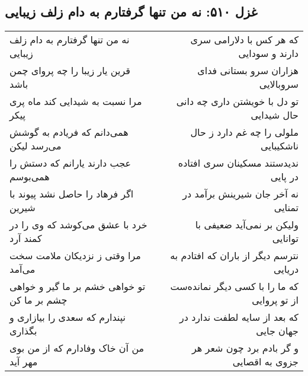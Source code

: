 \begin{center}
\section*{غزل ۵۱۰: نه من تنها گرفتارم به دام زلف زیبایی}
\label{sec:510}
\begin{longtable}{l p{0.5cm} r}
نه من تنها گرفتارم به دام زلف زیبایی
&&
که هر کس با دلارامی سری دارند و سودایی
\\
قرین یار زیبا را چه پروای چمن باشد
&&
هزاران سرو بستانی فدای سروبالایی
\\
مرا نسبت به شیدایی کند ماه پری پیکر
&&
تو دل با خویشتن داری چه دانی حال شیدایی
\\
همی‌دانم که فریادم به گوشش می‌رسد لیکن
&&
ملولی را چه غم دارد ز حال ناشکیبایی
\\
عجب دارند یارانم که دستش را همی‌بوسم
&&
ندیدستند مسکینان سری افتاده در پایی
\\
اگر فرهاد را حاصل نشد پیوند با شیرین
&&
نه آخر جان شیرینش برآمد در تمنایی
\\
خرد با عشق می‌کوشد که وی را در کمند آرد
&&
ولیکن بر نمی‌آید ضعیفی با توانایی
\\
مرا وقتی ز نزدیکان ملامت سخت می‌آمد
&&
نترسم دیگر از باران که افتادم به دریایی
\\
تو خواهی خشم بر ما گیر و خواهی چشم بر ما کن
&&
که ما را با کسی دیگر نمانده‌ست از تو پروایی
\\
نپندارم که سعدی را بیازاری و بگذاری
&&
که بعد از سایه لطفت ندارد در جهان جایی
\\
من آن خاک وفادارم که از من بوی مهر آید
&&
و گر بادم برد چون شعر هر جزوی به اقصایی
\\
\end{longtable}
\end{center}
